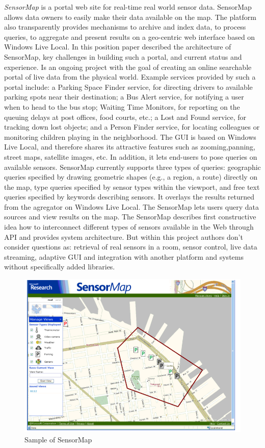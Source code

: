     \emph{SensorMap}\cite{nath2006challenges} is a portal web site for real-time real world sensor data. SensorMap allows data owners to easily make their data available on the map. The platform also transparently provides mechanisms to archive and index data, to process queries, to aggregate and present results on a geo-centric web interface based on Windows Live Local. In this position paper  described the architecture of SensorMap, key challenges in building such a portal, and current status and experience. Is an ongoing project with the goal of creating an online searchable portal of live data from the physical world. Example services provided by such a portal include: a Parking Space Finder service, for directing drivers to available parking spots near their destination; a Bus Alert service, for notifying a user when to head to the bus stop; Waiting Time Monitors, for reporting on the queuing delays at post offices, food courts, etc.; a Lost and Found service, for tracking down lost objects; and a Person Finder service, for locating colleagues or monitoring children playing in the neighborhood. The GUI is based on Windows Live Local, and therefore shares its attractive features such as zooming,panning, street maps, satellite images, etc. In addition, it lets end-users to pose queries on available sensors. SensorMap currently supports three types of queries: geographic queries specified by drawing geometric shapes (e.g., a region, a route) directly on the map, type queries specified by sensor types within the viewport, and free text queries specified by keywords describing sensors. It overlays the results returned from the agregator on Windows Live Local. The SensorMap lets users query data sources and view results on the map. The SensorMap describes first constructive idea how to interconnect different types of sensors available in the Web through API and provides system architecture. But within this project authors don't consider questions as: retrieval of real sensors in a room, sensor control, live data streaming, adaptive GUI and integration with another platform and systems without specifically added libraries. 
    \begin{figure}[!ht]
		\centering
		\includegraphics[scale=0.5]{Material/examples/SensorMap.png}   
		\caption[Sample of SensorMap]{Sample of SensorMap}                  
		\end{figure}

